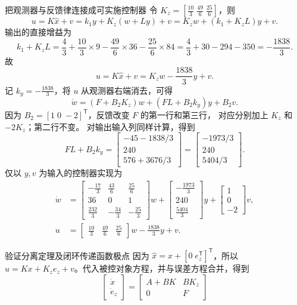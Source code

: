 \documentclass[11pt]{article}
\begin{document}
\begin{solution}
\begin{proofstep}{把观测器与反馈律连接成可实施控制器}
令 $K_z=[\frac{10}3\;\frac{49}6\;\frac{25}6]$，则
\[
 u=K\hat x+v=k_1y+K_z(w+Ly)+v
 =K_zw+(k_1+K_zL)y+v.
\]
输出的直接增益为
\[
 k_1+K_zL=\frac43+\frac{10}3\times9
 -\frac{49}6\times36-\frac{25}6\times84
 =\frac43+30-294-350=-\frac{1838}3.
\]
故
\[
 \boxed{u=K\hat x+v=K_zw-\frac{1838}3y+v.}
\]
记 $k_y=-\tfrac{1838}3$，将 $u$ 从观测器右端消去，可得
\[
 \dot w=(F+B_2K_z)w+(FL+B_2k_y)y+B_2v.
\]
因为 $B_2=[1\;0\;-2]^{\mathsf T}$，反馈改变 $F$ 的第一行和第三行，
对应分别加上 $K_z$ 和 $-2K_z$；第二行不变。
对输出输入列同样计算，得到
\[
 FL+B_2k_y=\begin{bmatrix}-45-1838/3\\240\\576+3676/3\end{bmatrix}
 =\begin{bmatrix}-1973/3\\240\\5404/3\end{bmatrix}.
\]
仅以 $y,v$ 为输入的控制器实现为
\[
 \boxed{\begin{aligned}
 \dot w&=\begin{bmatrix}
 -\frac{17}3&\frac{43}6&\frac{25}6\\
 36&0&1\\
 \frac{232}3&-\frac{34}3&-\frac{25}3
 \end{bmatrix}w
 +\begin{bmatrix}-\frac{1973}3\\240\\\frac{5404}3\end{bmatrix}y
 +\begin{bmatrix}1\\0\\-2\end{bmatrix}v,\\
 u&=\begin{bmatrix}\frac{10}3&\frac{49}6&\frac{25}6\end{bmatrix}w
 -\frac{1838}3y+v.
 \end{aligned}}
\]
\end{proofstep}
\tcbbreak
\begin{proofstep}{验证分离定理及闭环传递函数极点}
因为 $\hat x=x+[0\;e_z^{\mathsf T}]^{\mathsf T}$，所以
$u=Kx+K_ze_z+v$。代入被控对象方程，并与误差方程合并，得到
\[
 \begin{bmatrix}\dot x\\\dot e_z\end{bmatrix}
 =\begin{bmatrix}A+BK&BK_z\\0&F\end{bmatrix}
\]
\end{proofstep}
\end{solution}
\end{document}
